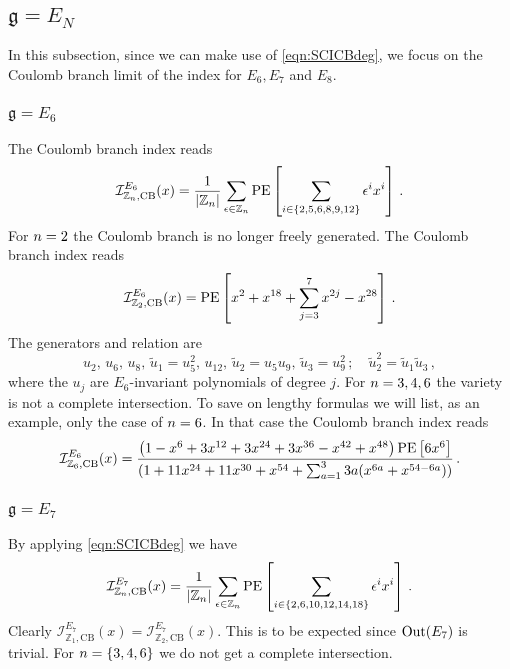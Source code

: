 \documentclass[main.tex]{subfiles}
\begin{document}
\subsection{\texorpdfstring{$\mathfrak{g}=E_N$}{g=EN}} 
In this subsection, since we can make use of \eqref{eqn:SCICBdeg}, we focus on the Coulomb branch limit of the index for $E_6,E_7$ and $ E_8$.
\subsubsection{$\mathfrak{g}=E_6$}
The Coulomb branch index reads
\begin{equation}
\mathcal{I}_{\mathbb{Z}_{n},\text{CB}}^{E_6}(x)=\frac{1}{|\mathbb{Z}_{n}|}\sum_{\epsilon\in\mathbb{Z}_{n}}\operatorname{\mathrm{PE}}\left[\sum_{i\in\{2,5,6,8,9,12\}}\epsilon^i x^i\right]\,.
\end{equation}
For ${n}=2$ the Coulomb branch is no longer freely generated. The Coulomb branch index reads
\begin{equation}
\mathcal{I}_{\mathbb{Z}_{2},\text{CB}}^{E_6}(x)=\operatorname{\mathrm{PE}}\left[x^2+x^{18}+\sum_{j=3}^7x^{2j}-x^{28}\right]\,.
\end{equation}
The generators and relation are 
\begin{equation}
u_2 ,\,u_6,\,u_8,\,\widetilde{u}_1=u_5^2,\,u_{12},\,\widetilde{u}_2=u_5u_9,\,\widetilde{u}_3=u_9^2\,;\quad \widetilde{u}_2^2=\widetilde{u}_1\widetilde{u}_3\,,
\end{equation}
where the $u_j$ are $E_6$-invariant polynomials of degree $j$. For $n=3,4,6$ the variety is not a complete intersection. To save on lengthy formulas we will list, as an example, only the case of $n=6$. In that case the Coulomb branch index reads
\begin{equation}
\mathcal{I}_{\mathbb{Z}_{6},\text{CB}}^{E_6}(x)=\frac{\left(1 - x^6 + 3 x^{12} + 3 x^{24} +  3 x^{36} - x^{42} + x^{48}\right)\operatorname{\mathrm{PE}}\left[6x^6\right]}{(1 +   11 x^{24} + 11 x^{30}  + x^{54}+\sum_{a=1}^33a(x^{6a}+x^{54-6a}))}\,.
\end{equation}

\subsubsection{$\mathfrak{g}=E_7$}
By applying \eqref{eqn:SCICBdeg} we have
\begin{equation}
\mathcal{I}_{\mathbb{Z}_{n},\text{CB}}^{E_7}(x)=\frac{1}{|\mathbb{Z}_{n}|}\sum_{\epsilon\in\mathbb{Z}_{n}}\operatorname{\mathrm{PE}}\left[\sum_{i\in\{2,6,10,12,14,18\}}\epsilon^i x^i\right]\,.
\end{equation}
Clearly $\mathcal{I}_{\mathbb{Z}_{1},\text{CB}}^{E_7}(x)=\mathcal{I}_{\mathbb{Z}_{2},\text{CB}}^{E_7}(x)$. This is to be expected since $\operatorname{Out}(E_7)$ is trivial. For ${n}=\{3,4,6\}$ we do not get a complete intersection.
\end{document}
